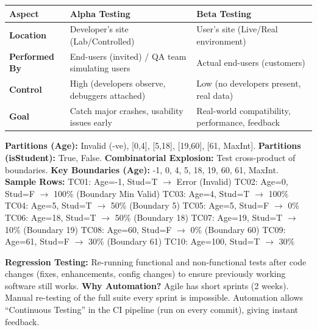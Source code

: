 \documentclass[11pt]{article}
\begin{document}
\begin{corrige}[Exercise 2]
\begin{center}
\begin{tabularx}{\linewidth}{|l|X|X|}
\hline
\rowcolor{popblueL}
\textbf{Aspect} & \textbf{Alpha Testing} & \textbf{Beta Testing} \\
\hline
\textbf{Location} & Developer's site (Lab/Controlled) & User's site (Live/Real environment) \\
\hline
\textbf{Performed By} & End-users (invited) / QA team simulating users & Actual end-users (customers) \\
\hline
\textbf{Control} & High (developers observe, debuggers attached) & Low (no developers present, real data) \\
\hline
\textbf{Goal} & Catch major crashes, usability issues early & Real-world compatibility, performance, feedback \\
\hline
\end{tabularx}
\end{center}
\end{corrige}

\begin{corrige}
\textbf{Partitions (Age):} Invalid (-ve), [0,4], [5,18], [19,60], [61, MaxInt].
\textbf{Partitions (isStudent):} True, False.
\textbf{Combinatorial Explosion:} Test cross-product of boundaries.
\textbf{Key Boundaries (Age):} -1, 0, 4, 5, 18, 19, 60, 61, MaxInt.
\textbf{Sample Rows:}
TC01: Age=-1, Stud=T $\rightarrow$ Error (Invalid)
TC02: Age=0, Stud=F $\rightarrow$ 100\% (Boundary Min Valid)
TC03: Age=4, Stud=T $\rightarrow$ 100\%
TC04: Age=5, Stud=T $\rightarrow$ 50\% (Boundary 5)
TC05: Age=5, Stud=F $\rightarrow$ 0\%
TC06: Age=18, Stud=T $\rightarrow$ 50\% (Boundary 18)
TC07: Age=19, Stud=T $\rightarrow$ 10\% (Boundary 19)
TC08: Age=60, Stud=F $\rightarrow$ 0\% (Boundary 60)
TC09: Age=61, Stud=F $\rightarrow$ 30\% (Boundary 61)
TC10: Age=100, Stud=T $\rightarrow$ 30\%
\end{corrige}

\begin{corrige}[Exercise 4]
\textbf{Regression Testing:} Re-running functional and non-functional tests after code changes (fixes, enhancements, config changes) to ensure previously working software still works.
\textbf{Why Automation?} Agile has short sprints (2 weeks). Manual re-testing of the full suite every sprint is impossible. Automation allows ``Continuous Testing'' in the CI pipeline (run on every commit), giving instant feedback.
\end{corrige}
\end{document}
